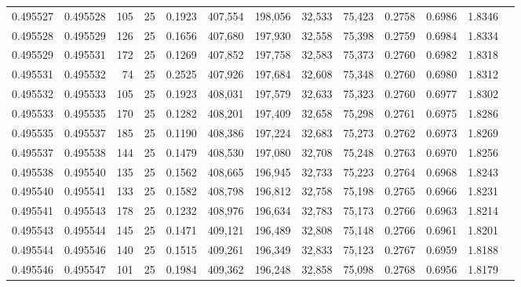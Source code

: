 \begin{tabular}{rrrrrrrrrrrrr}
0.495527 & 0.495528 &   105 &  25 &                                     0.1923 & 407,554 & 198,056 &  32,533 &  75,423 & 0.2758 & 0.6986 & 1.8346 \\
0.495528 & 0.495529 &   126 &  25 &                                     0.1656 & 407,680 & 197,930 &  32,558 &  75,398 & 0.2759 & 0.6984 & 1.8334 \\
0.495529 & 0.495531 &   172 &  25 &                                     0.1269 & 407,852 & 197,758 &  32,583 &  75,373 & 0.2760 & 0.6982 & 1.8318 \\
0.495531 & 0.495532 &    74 &  25 &                                     0.2525 & 407,926 & 197,684 &  32,608 &  75,348 & 0.2760 & 0.6980 & 1.8312 \\
0.495532 & 0.495533 &   105 &  25 &                                     0.1923 & 408,031 & 197,579 &  32,633 &  75,323 & 0.2760 & 0.6977 & 1.8302 \\
0.495533 & 0.495535 &   170 &  25 &                                     0.1282 & 408,201 & 197,409 &  32,658 &  75,298 & 0.2761 & 0.6975 & 1.8286 \\
0.495535 & 0.495537 &   185 &  25 &                                     0.1190 & 408,386 & 197,224 &  32,683 &  75,273 & 0.2762 & 0.6973 & 1.8269 \\
0.495537 & 0.495538 &   144 &  25 &                                     0.1479 & 408,530 & 197,080 &  32,708 &  75,248 & 0.2763 & 0.6970 & 1.8256 \\
0.495538 & 0.495540 &   135 &  25 &                                     0.1562 & 408,665 & 196,945 &  32,733 &  75,223 & 0.2764 & 0.6968 & 1.8243 \\
0.495540 & 0.495541 &   133 &  25 &                                     0.1582 & 408,798 & 196,812 &  32,758 &  75,198 & 0.2765 & 0.6966 & 1.8231 \\
0.495541 & 0.495543 &   178 &  25 &                                     0.1232 & 408,976 & 196,634 &  32,783 &  75,173 & 0.2766 & 0.6963 & 1.8214 \\
0.495543 & 0.495544 &   145 &  25 &                                     0.1471 & 409,121 & 196,489 &  32,808 &  75,148 & 0.2766 & 0.6961 & 1.8201 \\
0.495544 & 0.495546 &   140 &  25 &                                     0.1515 & 409,261 & 196,349 &  32,833 &  75,123 & 0.2767 & 0.6959 & 1.8188 \\
0.495546 & 0.495547 &   101 &  25 &                                     0.1984 & 409,362 & 196,248 &  32,858 &  75,098 & 0.2768 & 0.6956 & 1.8179 \\

\end{tabular}
